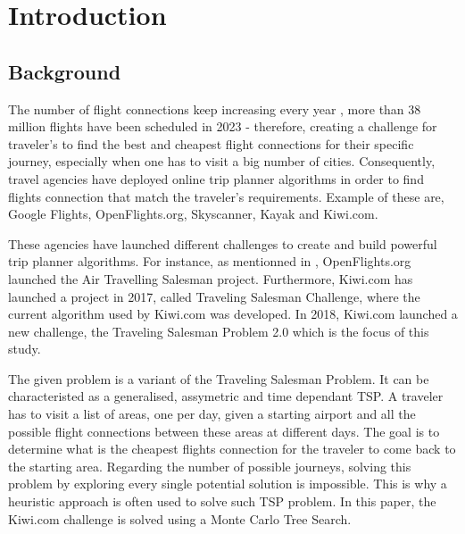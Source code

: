 \chapter{Introduction}
\label{Chapter1}



\section{Background}

The number of flight connections keep increasing every year \cite{statista_flights_year}, more than 38 million flights have been scheduled in 2023 - therefore, creating a challenge for traveler's to find the best and cheapest flight connections for their specific journey, especially when one has to visit a big number of cities.
Consequently, travel agencies have deployed online trip planner algorithms in order to find flights connection that match the traveler's requirements. Example of these are, Google Flights, OpenFlights.org, Skyscanner, Kayak and Kiwi.com.

These agencies have launched different challenges to create and build powerful trip planner algorithms. For instance, as mentionned in \cite{reinforcement_learning_yaro}, OpenFlights.org launched the Air Travelling Salesman project. Furthermore, Kiwi.com has launched a project in 2017, called Traveling Salesman Challenge, where the current algorithm used by Kiwi.com was developed. In 2018, Kiwi.com launched a new challenge, the Traveling Salesman Problem 2.0 which is the focus of this study.

The given problem is a variant of the Traveling Salesman Problem. It can be characteristed as a generalised, assymetric and time dependant TSP.
A traveler has to visit a list of areas, one per day, given a starting airport and all the possible flight connections between these areas at different days. The goal is to determine what is the cheapest flights connection for the traveler to come back to the starting area. Regarding the number of possible journeys, solving this problem by exploring every single potential solution is impossible. This is why a heuristic approach is often used to solve such TSP problem. In this paper, the Kiwi.com challenge is solved using a Monte Carlo Tree Search.
